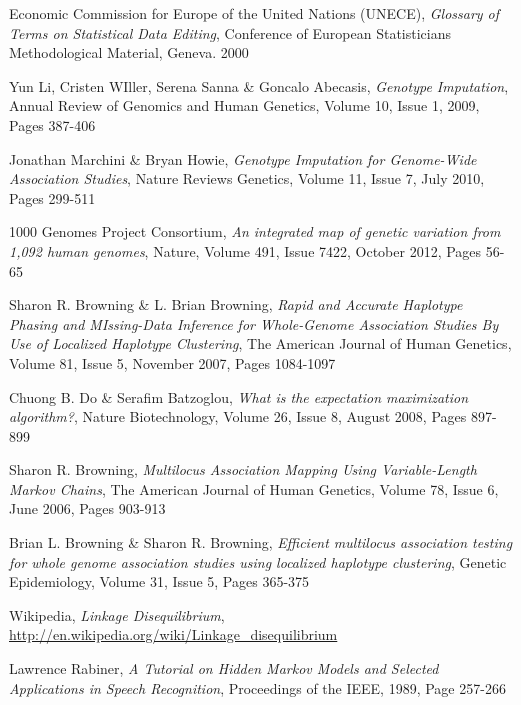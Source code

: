\documentclass[a4paper,11pt,twoside,abstraction,titlepage]{article}
\begin{document}
\begin{thebibliography}{99}

 Economic Commission for Europe of the United Nations (UNECE), \emph{Glossary of Terms on Statistical Data Editing}, Conference of European Statisticians Methodological Material, Geneva. 2000

 Yun Li, Cristen WIller, Serena Sanna \& Goncalo Abecasis, \emph{Genotype Imputation}, Annual Review of Genomics and Human Genetics, Volume 10, Issue 1,  2009, Pages 387-406

 Jonathan Marchini \& Bryan Howie, \emph{Genotype Imputation for Genome-Wide Association Studies}, Nature Reviews Genetics, Volume 11, Issue 7, July 2010, Pages 299-511

 1000 Genomes Project Consortium, \emph{An integrated map of genetic variation from 1,092 human genomes}, Nature, Volume 491, Issue 7422, October 2012, Pages 56-65

 Sharon R. Browning \& L. Brian Browning, \emph{Rapid and Accurate Haplotype Phasing and MIssing-Data Inference for Whole-Genome Association Studies By Use of Localized Haplotype Clustering}, The American Journal of Human Genetics, Volume 81, Issue 5, November 2007, Pages 1084-1097

 Chuong B. Do \& Serafim Batzoglou, \emph{What is the expectation maximization algorithm?}, Nature Biotechnology, Volume 26, Issue 8, August 2008, Pages 897-899

 Sharon R. Browning, \emph{Multilocus Association Mapping Using Variable-Length Markov Chains}, The American Journal of Human Genetics, Volume 78, Issue 6, June 2006, Pages 903-913

 Brian L. Browning \& Sharon R. Browning, \emph{Efficient multilocus association testing for whole genome association studies using localized haplotype clustering},  Genetic Epidemiology, Volume 31, Issue 5, Pages 365-375

 Wikipedia, \emph{Linkage Disequilibrium}, \url{http://en.wikipedia.org/wiki/Linkage_disequilibrium}

 Lawrence Rabiner, \emph{A Tutorial on Hidden Markov Models and Selected Applications in Speech Recognition}, Proceedings of the IEEE, 1989, Page 257-266




\end{thebibliography}
\end{document}
